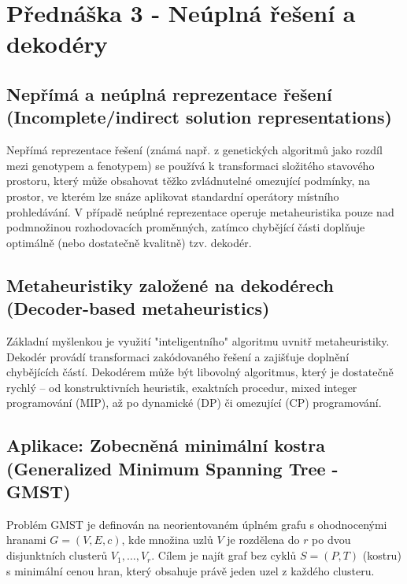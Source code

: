 \documentclass[12pt,a4paper]{article}
\theoremstyle{definition}
\begin{document}
\section{Přednáška 3 - Neúplná řešení a dekodéry}

\subsection{Nepřímá a neúplná reprezentace řešení (Incomplete/indirect solution representations)}
Nepřímá reprezentace řešení (známá např. z genetických algoritmů jako rozdíl mezi genotypem a fenotypem) se používá k transformaci složitého stavového prostoru, který může obsahovat těžko zvládnutelné omezující podmínky, na prostor, ve kterém lze snáze aplikovat standardní operátory místního prohledávání. V případě neúplné reprezentace operuje metaheuristika pouze nad podmnožinou rozhodovacích proměnných, zatímco chybějící části doplňuje optimálně (nebo dostatečně kvalitně) tzv. dekodér.

\subsection{Metaheuristiky založené na dekodérech (Decoder-based metaheuristics)}
Základní myšlenkou je využití "inteligentního" algoritmu uvnitř metaheuristiky. Dekodér provádí transformaci zakódovaného řešení a zajišťuje doplnění chybějících částí. Dekodérem může být libovolný algoritmus, který je dostatečně rychlý – od konstruktivních heuristik, exaktních procedur, mixed integer programování (MIP), až po dynamické (DP) či omezující (CP) programování.

\subsection{Aplikace: Zobecněná minimální kostra (Generalized Minimum Spanning Tree - GMST)}
Problém GMST je definován na neorientovaném úplném grafu s ohodnocenými hranami $G = (V, E, c)$, kde množina uzlů $V$ je rozdělena do $r$ po dvou disjunktních clusterů $V_1, \dots, V_r$. Cílem je najít graf bez cyklů $S = (P, T)$ (kostru) s minimální cenou hran, který obsahuje právě jeden uzel z každého clusteru.
\end{document}
